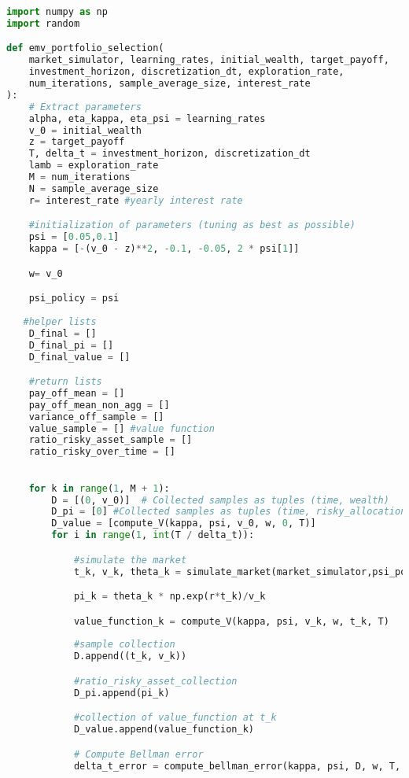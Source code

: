 \documentclass[oneside, a4paper, onecolumn, 11pt]{article}
\begin{document}
\begin{lstlisting}[language=Python, caption=EMV Portfolio Selection Algorithm, label=code:emv]
import numpy as np
import random

def emv_portfolio_selection(
    market_simulator, learning_rates, initial_wealth, target_payoff, 
    investment_horizon, discretization_dt, exploration_rate, 
    num_iterations, sample_average_size, interest_rate
):
    # Extract parameters
    alpha, eta_kappa, eta_psi = learning_rates
    v_0 = initial_wealth  
    z = target_payoff
    T, delta_t = investment_horizon, discretization_dt
    lamb = exploration_rate
    M = num_iterations
    N = sample_average_size
    r= interest_rate #yearly interest rate 

    #initialization of parameters (tuning as best as possible)
    psi = [0.05,0.1]
    kappa = [-(v_0 - z)**2, -0.1, -0.05, 2 * psi[1]]

    w= v_0

    psi_policy = psi
   
   #helper lists
    D_final = []
    D_final_pi = []
    D_final_value = []

    #return lists
    pay_off_mean = []
    pay_off_mean_non_agg = []
    variance_off_sample = []
    value_sample = [] #value function
    ratio_risky_asset_sample = []
    ratio_risky_over_time = []
    

    for k in range(1, M + 1):
        D = [(0, v_0)]  # Collected samples as tuples (time, wealth)
        D_pi = [0] #Collected samples as tuples (time, risky_allocation)
        D_value = [compute_V(kappa, psi, v_0, w, 0, T)]
        for i in range(1, int(T / delta_t)):

            #simulate the market
            t_k, v_k, theta_k = simulate_market(market_simulator,psi_policy, D, w, T, lamb,delta_t,r)

            pi_k = theta_k * np.exp(r*t_k)/v_k

            value_function_k = compute_V(kappa, psi, v_k, w, t_k, T)
            
            #sample collection
            D.append((t_k, v_k))

            #ratio_risky_asset_collection 
            D_pi.append(pi_k)

            #collection of value_function at t_k 
            D_value.append(value_function_k)

            # Compute Bellman error
            delta_t_error = compute_bellman_error(kappa, psi, D, w, T, lamb, delta_t)
            

\end{lstlisting}
\end{document}
